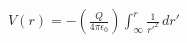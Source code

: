 \documentclass[preview]{standalone}
\begin{document}
\begin{align*}
V(r) = - \left( \frac{Q}{4\pi \epsilon_0} \right) \int_{\infty}^{r}\frac{1}{r'^2} \,dr'
\end{align*}
\end{document}
